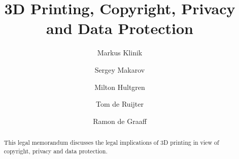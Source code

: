 \documentclass[a4paper]{article}
\begin{document}
\title{3D Printing, Copyright, Privacy and Data Protection}
\author{Markus Klinik
   \and Sergey Makarov
   \and Milton Hultgren
   \and Tom de Ruijter
   \and Ramon de Graaff}
\maketitle

\begin{abstract}

This legal memorandum discusses the legal implications of 3D printing in view of
copyright, privacy and data protection.

\end{abstract}







\end{document}
